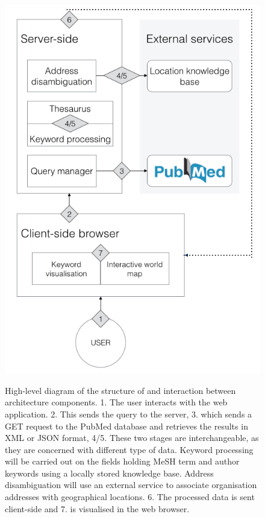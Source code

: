 \documentclass[PROP_AGutteridge_CS.tex]{subfiles}
\begin{document}
\begin{figure}
 	\caption{High-level diagram of the structure of and interaction between architecture components. 1. The user interacts with the web application. 2. This sends the query to the server, 3. which sends a GET request to the PubMed database and retrieves the results in XML or JSON format, 4/5. These two stages are interchangeable, as they are concerned with different type of data. Keyword processing will be carried out on the fields holding MeSH term and author keywords using a locally stored knowledge base. Address disambiguation will use an external service to associate organisation addresses with geographical locations. 6. The processed data is sent client-side and 7. is visualised in the web browser.}
	\includegraphics{../lib/images/system-arch}
	\label{fig:SA}
\end{figure}

\end{document}
